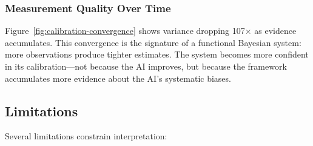 \subsubsection{Measurement Quality Over Time}

Figure~\ref{fig:calibration-convergence} shows variance dropping 107$\times$ as evidence accumulates. This convergence is the signature of a functional Bayesian system: more observations produce tighter estimates. The system becomes more confident in its calibration---not because the AI improves, but because the framework accumulates more evidence about the AI's systematic biases.

\subsection{Limitations}

Several limitations constrain interpretation:

